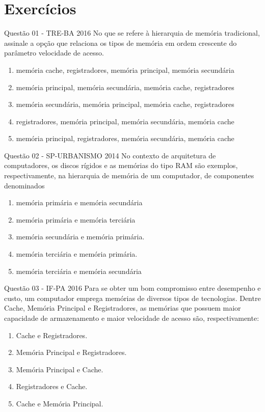 \documentclass[aspectratio=169,
				xcolor=table]{beamer}
\begin{document}
	\section{Exercícios}
	\begin{frame}{Questão 01 - TRE-BA 2016}
		No que se refere à hierarquia de memória tradicional, assinale a opção que relaciona os tipos de memória em ordem crescente do parâmetro velocidade de acesso.
		\vspace{1em}
		\begin{enumerate}[a]
		\large
			\item memória cache, registradores, memória principal, memória secundária
			\item memória principal, memória secundária, memória cache, registradores
			\item memória secundária, memória principal, memória cache, registradores
			\item registradores, memória principal, memória secundária, memória cache
			\item memória principal, registradores, memória secundária, memória cache		
		\end{enumerate}
	\end{frame}
	
	\begin{frame}{Questão 02 - SP-URBANISMO 2014}
		No contexto de arquitetura de computadores, os discos rígidos e as memórias do tipo RAM são exemplos, respectivamente, na hierarquia de memória de um computador, de componentes denominados
		\begin{enumerate}[a]
			\item memória primária e memória secundária
			\item memória primária e memória terciária
			\item memória secundária e memória primária.
			\item memória terciária e memória primária.
			\item memória terciária e memória secundária
		\end{enumerate}
	\end{frame}
	
	\begin{frame}{Questão 03 - IF-PA 2016}
		Para se obter um bom compromisso entre desempenho e custo, um computador emprega memórias de diversos tipos de tecnologias. Dentre Cache, Memória Principal e Registradores, as memórias que possuem maior capacidade de armazenamento e maior velocidade de acesso são, respectivamente:
		\begin{enumerate}[a]
			\item Cache e Registradores.
			\item Memória Principal e Registradores.
			\item Memória Principal e Cache.
			\item Registradores e Cache.
			\item Cache e Memória Principal.
		\end{enumerate}
	\end{frame}
\end{document}
